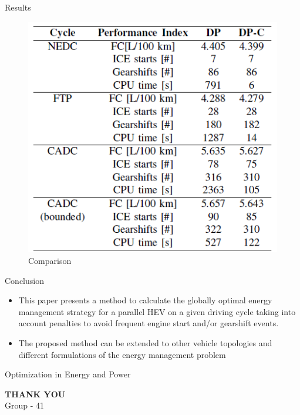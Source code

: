 \documentclass{beamer}
\begin{document}
\begin{frame}{Results}
\begin{figure}
    \centering
    \includegraphics[scale=0.7]{Results.png}
    \caption{Comparison}
    \label{fig:Tab}
\end{figure}
    
\end{frame}

\begin{frame}{Conclusion}
\begin{itemize}
    \item This paper presents a method to calculate the globally optimal energy management strategy for a parallel HEV on a given driving cycle taking into account penalties to avoid frequent engine start and/or gearshift events. 
    \item The proposed method can be extended to other vehicle topologies and different formulations of the energy management problem
    
\end{itemize}

\end{frame}

\begin{frame}{Optimization in Energy and Power}
 \begin{center}
   \textbf{THANK YOU} \\
    \vspace{0.5cm}
    Group - 41\\
    \vspace{1cm}

 \end{center}   
    
\end{frame}
\end{document}

